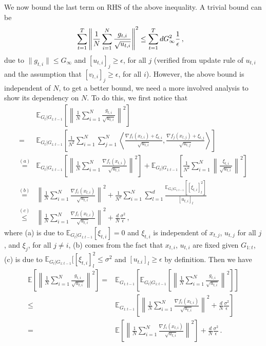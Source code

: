 \documentclass[11pt]{article}
\begin{document}
We now bound the last term on RHS of the above inequality. A trivial bound can be
\begin{align}\notag
& \sum_{t=1}^T \left\| \frac{1}{N} \sum_{i=1}^N \frac{g_{t,i}}{\sqrt{u_{t,i}}} \right\|^2  
\leq  \sum_{t=1}^T d G_{\infty}^2 \frac{1}{\epsilon}\, ,
\end{align}
due to $\|g_{t,i}\| \leq G_{\infty}$ and $[u_{t,i}]_j \geq \epsilon$, for all $j$ (verified from update rule of  $u_{t,i}$ and the assumption that $[v_{t,i}]_j \geq \epsilon$, for all $i$). 
However, the above bound is independent of $N$, to get a better bound, we need a more involved analysis to show its dependency on $N$. To do this, we first notice that
\begin{align}
&\mathbb E_{G_t| G_{1:t-1}} \left[ \left\| \frac{1}{N} \sum_{i=1}^N \frac{g_{t,i}}{\sqrt{u_{t,i}}} \right\|^2 \right] \nonumber  \\
= & \mathbb E_{G_t| G_{1:t-1}} \left[  \frac{1}{N^2} \sum_{i=1}^N 
\sum_{j=1}^N \left \langle \frac{\nabla f_i(x_{t,i}) + \xi_{t,i }}{\sqrt{u_{t,i}}}, \frac{\nabla f_j(x_{t,j}) + \xi_{t,j }}{\sqrt{u_{t,j}}} \right \rangle \right]  \nonumber  \\
\overset{(a)}{=}&\mathbb E_{G_t| G_{1:t-1}} \left[ \left\| \frac{1}{N} \sum_{i=1}^N \frac{\nabla f_i(x_{t,i})}{\sqrt{u_{t,i}}} \right\|^2 \right]  +  \mathbb E_{G_t| G_{1:t-1}} \left[  \frac{1}{N^2} \sum_{i=1}^N
\left \| \frac{ \xi_{t,i }}{\sqrt{u_{t,i}}}\right \|^2 \right] \nonumber  \\
\overset{(b)}{=}&  \left\| \frac{1}{N} \sum_{i=1}^N \frac{\nabla f_i(x_{t,i})}{\sqrt{u_{t,i}}} \right\|^2   +  \frac{1}{N^2} \sum_{i=1}^N  \sum_{l=1}^d
\frac{ \mathbb E_{G_t| G_{1:t-1}} [[\xi_{t,i}]_l^2] }{[u_{t,i}]_l}  \nonumber  \\
\overset{(c)}{\leq} & \left\| \frac{1}{N} \sum_{i=1}^N \frac{\nabla f_i(x_{t,i})}{\sqrt{u_{t,i}}} \right\|^2   +    \frac{d}{N}  
\frac{ \sigma^2 }{\epsilon} \, ,\nonumber 
\end{align}
where (a) is due to $\mathbb E_{G_t | G_{1:t-1}} [\xi_{t,i}] = 0 $ and $\xi_{t,i}$ is independent of $x_{t,j}$, $u_{t,j}$ for all $j$, and $ \xi_{j}$, for all $j \neq i$, (b) comes from the fact that $x_{t,i}$, $u_{t,i}$ are fixed given $G_{1:t}$, (c) is due to $\mathbb E_{G_t| G_{1:t-1}} [[\xi_{t,i}]_l^2 \leq \sigma^2$ and $[u_{t.i}]_l \geq \epsilon$ by definition.
Then we have 
\begin{align}\label{eq: split_var}
\mathbb E\left[ \left\| \frac{1}{N} \sum_{i=1}^N \frac{g_{t,i}}{\sqrt{u_{t,i}}} \right\|^2 \right] =  & \mathbb E_{ G_{1:t-1}} \left[ \mathbb E_{G_t| G_{1:t-1}} \left[ \left\| \frac{1}{N} \sum_{i=1}^N \frac{g_{t,i}}{\sqrt{u_{t,i}}} \right\|^2 \right] \right] \nonumber \\
\leq & \mathbb E_{ G_{1:t-1}} \left[  \left\| \frac{1}{N} \sum_{i=1}^N \frac{\nabla f_i(x_{t,i})}{\sqrt{u_{t,i}}} \right\|^2   +    \frac{d}{N}  
\frac{ \sigma^2 }{\epsilon} \right] \nonumber \\
= &  \mathbb E \left[  \left\| \frac{1}{N} \sum_{i=1}^N \frac{\nabla f_i(x_{t,i})}{\sqrt{u_{t,i}}} \right\|^2     \right] + \frac{d}{N}  
\frac{ \sigma^2 }{\epsilon}  \, .
\end{align}
\end{document}
